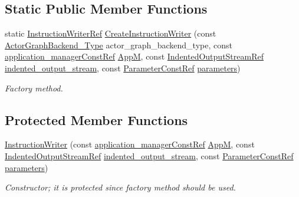 \subsection*{Static Public Member Functions}
\begin{DoxyCompactItemize}
\item 
static \hyperlink{instruction__writer_8hpp_a40ea26c38a2909ba48f88f997144b260}{Instruction\+Writer\+Ref} \hyperlink{classInstructionWriter_a128b0f63616c37f0442cd1977d40f63c}{Create\+Instruction\+Writer} (const \hyperlink{actor__graph__backend_8hpp_a7b7f7f8f18d0165be52a619da8869d0a}{Actor\+Graph\+Backend\+\_\+\+Type} actor\+\_\+graph\+\_\+backend\+\_\+type, const \hyperlink{application__manager_8hpp_abb985163a2a3fb747f6f03b1eaadbb44}{application\+\_\+manager\+Const\+Ref} \hyperlink{classInstructionWriter_adc648b325e6ccab17a41fb16f503ca92}{AppM}, const \hyperlink{indented__output__stream_8hpp_ab32278e11151ef292759c88e99b77feb}{Indented\+Output\+Stream\+Ref} \hyperlink{classInstructionWriter_a8d06403d2bdb8f66559e2d4c2f1f1b48}{indented\+\_\+output\+\_\+stream}, const \hyperlink{Parameter_8hpp_a37841774a6fcb479b597fdf8955eb4ea}{Parameter\+Const\+Ref} \hyperlink{classInstructionWriter_a331d7d35c5526ead7951c74f4ecbe667}{parameters})
\begin{DoxyCompactList}\small\item\em Factory method. \end{DoxyCompactList}\end{DoxyCompactItemize}
\subsection*{Protected Member Functions}
\begin{DoxyCompactItemize}
\item 
\hyperlink{classInstructionWriter_ada26768a0d9c74b21b275f11fe4985e7}{Instruction\+Writer} (const \hyperlink{application__manager_8hpp_abb985163a2a3fb747f6f03b1eaadbb44}{application\+\_\+manager\+Const\+Ref} \hyperlink{classInstructionWriter_adc648b325e6ccab17a41fb16f503ca92}{AppM}, const \hyperlink{indented__output__stream_8hpp_ab32278e11151ef292759c88e99b77feb}{Indented\+Output\+Stream\+Ref} \hyperlink{classInstructionWriter_a8d06403d2bdb8f66559e2d4c2f1f1b48}{indented\+\_\+output\+\_\+stream}, const \hyperlink{Parameter_8hpp_a37841774a6fcb479b597fdf8955eb4ea}{Parameter\+Const\+Ref} \hyperlink{classInstructionWriter_a331d7d35c5526ead7951c74f4ecbe667}{parameters})
\begin{DoxyCompactList}\small\item\em Constructor; it is protected since factory method should be used. \end{DoxyCompactList}\end{DoxyCompactItemize}
